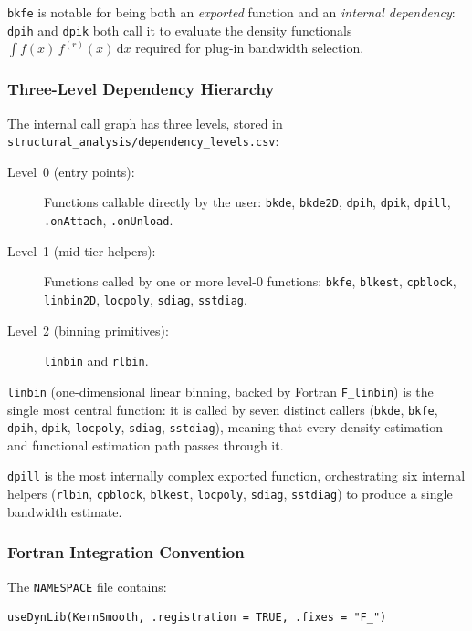 \documentclass[12pt,a4paper]{article}
\begin{document}
\texttt{bkfe} is notable for being both an \emph{exported} function and an \emph{internal dependency}: \texttt{dpih} and \texttt{dpik} both call it to evaluate the density functionals $\int f(x)\,f^{(r)}(x)\,\mathrm{d}x$ required for plug-in bandwidth selection.

\subsubsection{Three-Level Dependency Hierarchy}

The internal call graph has three levels, stored in \texttt{structural\_analysis/dependency\_levels.csv}:

\begin{description}
  \item[Level~0 (entry points):] Functions callable directly by the user: \texttt{bkde}, \texttt{bkde2D}, \texttt{dpih}, \texttt{dpik}, \texttt{dpill}, \texttt{.onAttach}, \texttt{.onUnload}.
  \item[Level~1 (mid-tier helpers):] Functions called by one or more level-0 functions: \texttt{bkfe}, \texttt{blkest}, \texttt{cpblock}, \texttt{linbin2D}, \texttt{locpoly}, \texttt{sdiag}, \texttt{sstdiag}.
  \item[Level~2 (binning primitives):] \texttt{linbin} and \texttt{rlbin}.
\end{description}

\texttt{linbin} (one-dimensional linear binning, backed by Fortran \texttt{F\_linbin}) is the single most central function: it is called by seven distinct callers (\texttt{bkde}, \texttt{bkfe}, \texttt{dpih}, \texttt{dpik}, \texttt{locpoly}, \texttt{sdiag}, \texttt{sstdiag}), meaning that every density estimation and functional estimation path passes through it.

\texttt{dpill} is the most internally complex exported function, orchestrating six internal helpers (\texttt{rlbin}, \texttt{cpblock}, \texttt{blkest}, \texttt{locpoly}, \texttt{sdiag}, \texttt{sstdiag}) to produce a single bandwidth estimate.

\subsubsection{Fortran Integration Convention}

The \texttt{NAMESPACE} file contains:

\begin{lstlisting}[style=shell]
useDynLib(KernSmooth, .registration = TRUE, .fixes = "F_")
\end{lstlisting}
\end{document}
